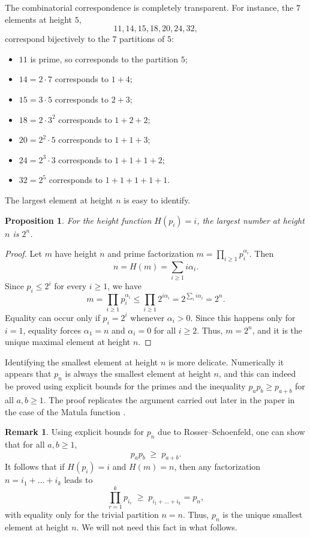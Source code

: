 \documentclass[11pt]{article}
\newtheorem{proposition}{Proposition}
\theoremstyle{definition}
\newtheorem{remark}{Remark}
\begin{document}
The combinatorial correspondence is completely transparent.  For
instance, the $7$ elements at height $5$,
\[
  11, 14, 15, 18, 20, 24, 32,
\]
correspond bijectively to the $7$ partitions of $5$:
\begin{itemize}
\item $11$ is prime, so corresponds to the partition $5$;
\item $14=2\cdot7$ corresponds to $1+4$;
\item $15=3\cdot5$ corresponds to $2+3$;
\item $18=2\cdot 3^2$ corresponds to $1+2+2$;
\item $20=2^2\cdot 5$ corresponds to $1+1+3$;
\item $24=2^3\cdot 3$ corresponds to $1+1+1+2$;
\item $32=2^5$ corresponds to $1+1+1+1+1$.
\end{itemize}

The largest element at height $n$ is easy to identify.

\begin{proposition}\label{prop:max-H=i}
For the height function $H(p_i)=i$, the largest number at height $n$
is $2^n$.
\end{proposition}

\begin{proof}
Let $m$ have height $n$ and prime factorization
$m=\prod_{i\ge1}p_i^{\alpha_i}$.  Then
\[
  n=H(m)=\sum_{i\ge1}i\alpha_i.
\]
Since $p_i\le 2^i$ for every $i\ge1$, we have
\[
  m=\prod_{i\ge1}p_i^{\alpha_i}
  \le \prod_{i\ge1}2^{i\alpha_i}
  =2^{\sum_i i\alpha_i}
  =2^n.
\]
Equality can occur only if $p_i=2^i$ whenever $\alpha_i>0$.  Since this happens
only for $i=1$, equality forces $\alpha_1=n$ and $\alpha_i=0$ for all $i\ge2$.
Thus, $m=2^n$, and it is the unique maximal element at height $n$.
\end{proof}

Identifying the smallest element at height $n$ is more delicate.
Numerically it appears that $p_n$ is always the smallest element at
height $n$, and this can indeed be proved using explicit bounds for
the primes and the inequality $p_a p_b \ge p_{a+b}$ for all
$a,b\ge1$. The proof replicates the argument carried out later in the paper in the case of the Matula function \cite{gutman}.

\begin{remark}
Using explicit bounds for $p_n$ due to Rosser--Schoenfeld, one can
show that for all $a,b\ge1$,
\[
  p_a p_b \;\ge\; p_{a+b}.
\]
It follows that if $H(p_i)=i$ and $H(m)=n$, then any factorization
$n=i_1+\dots+i_k$ leads to
\[
  \prod_{r=1}^k p_{i_r} \;\ge\; p_{i_1+\dots+i_k}=p_n,
\]
with equality only for the trivial partition $n=n$.  Thus, $p_n$ is the
unique smallest element at height $n$.  We will not need this fact in
what follows.
\end{remark}
\end{document}
